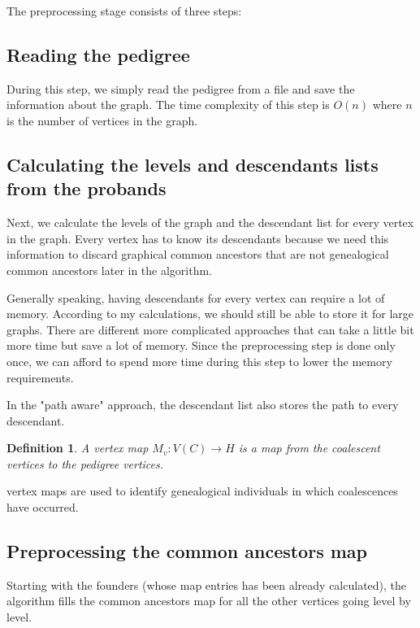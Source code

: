 \documentclass[14pt]{extarticle}
\newtheorem{definition}{Definition}
\begin{document}
The preprocessing stage consists of three steps:

\subsection{Reading the pedigree}

During this step, we simply read the pedigree from a file and save the information about the graph. The time complexity of this step is $O(n)$ where $n$ is the number of vertices in the graph.

\subsection{Calculating the levels and descendants lists from the probands}

Next, we calculate the levels of the graph and the descendant list for every vertex in the graph. Every vertex has to know its descendants because we need this information to discard graphical common ancestors that are not genealogical common ancestors later in the algorithm.

Generally speaking, having descendants for every vertex can require a lot of memory. According to my calculations, we should still be able to store it for large graphs. There are different more complicated approaches that can take a little bit more time but save a lot of memory. Since the preprocessing step is done only once, we can afford to spend more time during this step to lower the memory requirements.

In the "path aware" approach, the descendant list also stores the path to every descendant.



\begin{definition}
A vertex map $M_v:V(C) \rightarrow H$ is a map from the coalescent vertices to the pedigree vertices.   
\end{definition}
vertex maps are used to identify genealogical individuals in which coalescences have occurred. 

\subsection{Preprocessing the common ancestors map}

Starting with the founders (whose map entries has been already calculated), the algorithm fills the common ancestors map for all the other vertices going level by level.
\end{document}
